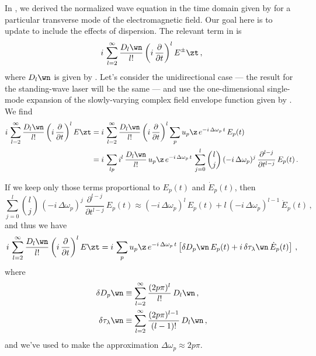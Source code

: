 In , we derived the normalized wave equation in the time domain given by  for a particular transverse mode of the electromagnetic field. Our goal here is to update  to include the effects of dispersion. The relevant term in  is
\begin{equation*}
    i\, \sum_{l = 2}^\infty \frac{D_l\wn}{l!} \left(i\, \frac{\partial}{\partial t}\right)^l E^\pm\zt\, ,
\end{equation*}
where $D_l\wn$ is given by . Let's consider the unidirectional case --- the result for the standing-wave laser will be the same --- and use the one-dimensional single-mode expansion of the slowly-varying complex field envelope function given by . We find
\begin{equation}
    \begin{split}
        i\, \sum_{l = 2}^\infty \frac{D_l\wn}{l!} \left(i\, \frac{\partial}{\partial t}\right)^l E\zt &= i\, \sum_{l = 2}^\infty \frac{D_l\wn}{l!} \left(i\, \frac{\partial}{\partial t}\right)^l \sum_p u_p\z\, e^{-i\, \Delta \omega_p\, t}\, E_p(t) \\
        &= i\, \sum_{l p} i^l\, \frac{D_l\wn}{l!}\, u_p\z\, e^{-i\, \Delta \omega_p\, t}\, \sum_{j = 0}^{l} \binom{l}{j}\, (-i\, \Delta \omega_p)^j\, \frac{\partial^{l - j}}{\partial t^{l - j}}\, E_p(t)\, . 
    \end{split}
\end{equation}

If we keep only those terms proportional to $E_p(t)$ and $\dot{E}_p(t)$, then
\begin{equation*}
    \sum_{j = 0}^{l} \binom{l}{j}\, (-i\, \Delta \omega_p)^j\, \frac{\partial^{l - j}}{\partial t^{l - j}}\, E_p(t) \approx (-i\, \Delta \omega_p)^l\, E_p(t) + l\, (-i\, \Delta \omega_p)^{l - 1}\, \dot{E}_p(t)\, ,
\end{equation*}
and thus we have
\begin{equation} \label{eqn:mml_1d_disp_cont}
    i\, \sum_{l = 2}^\infty \frac{D_l\wn}{l!} \left(i\, \frac{\partial}{\partial t}\right)^l E\zt = i\, \sum_p u_p\z\, e^{-i\, \Delta \omega_p\, t} \left[ \delta D_p\wn\, E_p(t) + i\, \delta \tau_\lambda\wn\, \dot{E}_p(t) \right]\, ,
\end{equation}
where
\begin{subequations} \label{eqn:mml_1d_delta_dt_q_def}
    \begin{align}
        \label{eqn:mml_1d_delta_d_q_def}
        \delta D_p\wn &\equiv \sum_{l = 2}^\infty \frac{(2 p \pi)^l}{l!}\, D_l\wn\, , \\
        \label{eqn:mml_1d_delta_tau_q_def}
        \delta \tau_\lambda\wn &\equiv \sum_{l = 2}^\infty \frac{(2 p \pi)^{l - 1}}{(l - 1)!}\, D_l\wn\, ,
    \end{align}
\end{subequations}
and we've used  to make the approximation $\Delta \omega_p \approx 2 p \pi$.

